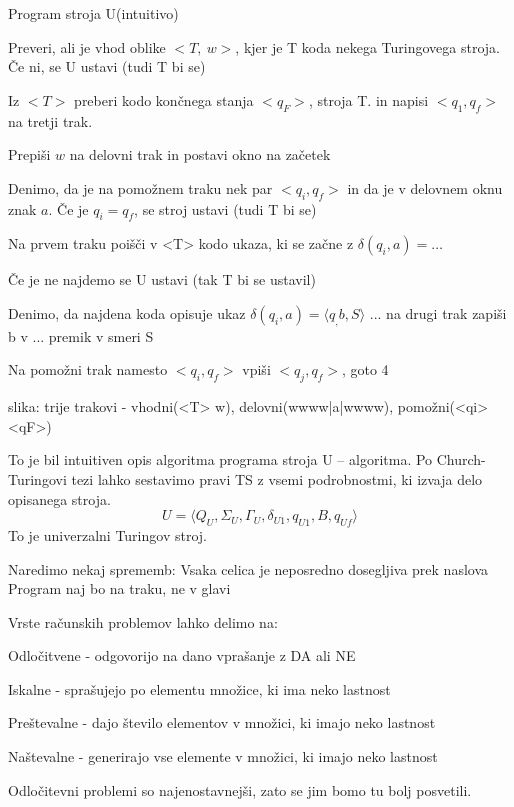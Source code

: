\documentclass[10pt,a4paper,oneside]{book}
\begin{document}
Program stroja U(intuitivo)
\begin{items}
\item Preveri, ali je vhod oblike $<T,\ w>$, kjer je T koda nekega Turingovega stroja. Če ni, se U ustavi (tudi T bi se)
\item Iz $<T>$ preberi kodo končnega stanja $<q_F>$, stroja T. in napisi $<q_1, q_f>$ na tretji trak.
\item Prepiši $w$ na delovni trak in postavi okno na začetek 
\item Denimo, da je na pomožnem traku nek par $<q_i, q_f>$ in da je v delovnem oknu znak $a$. Če je $q_i=q_f$, se stroj ustavi (tudi T bi se)
\item Na prvem traku poišči v <T> kodo ukaza, ki se začne z $\delta(q_i, a)=\dots$
\item Če je ne najdemo se U ustavi (tak T bi se ustavil)
\item Denimo, da najdena koda opisuje ukaz $\delta(q_i, a)=\langle q_, b, S \rangle$ ... na drugi trak zapiši b v ... premik v smeri S
\item Na pomožni trak namesto $<q_i,q_f>$ vpiši $<q_j,q_f>$, goto 4
\end{items}
\fixme slika: trije trakovi - vhodni(<T> w), delovni(wwww|a|wwww), pomožni(<qi><qF>)

To je bil intuitiven opis algoritma programa stroja U -- algoritma. Po Church-Turingovi tezi lahko sestavimo pravi TS z vsemi podrobnostmi, ki izvaja delo opisanega stroja.
\[U=\langle Q_U,\Sigma_U,\Gamma_U,\delta_{U1},q_{U1},B,q_{Uf} \rangle  \]
To je univerzalni Turingov stroj.

Naredimo nekaj sprememb:
Vsaka celica je neposredno dosegljiva prek naslova
Program naj bo na traku, ne v glavi

Vrste računskih problemov lahko delimo na:
\begin{items}
\item Odločitvene - odgovorijo na dano vprašanje z DA ali NE %
\item Iskalne - sprašujejo po elementu množice, ki ima neko lastnost
\item Preštevalne - dajo število elementov v množici, ki imajo neko lastnost
\item Naštevalne - generirajo vse elemente v množici, ki imajo neko lastnost
\end{items}
Odločitevni problemi so najenostavnejši, zato se jim bomo tu bolj posvetili.
\end{document}
